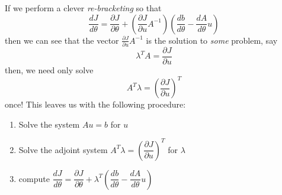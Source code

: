 If we perform a clever \textit{re-bracketing} so that
\begin{equation}
  \frac{dJ}{d\theta} = \frac{\partial J}{\partial \theta} + \left(\frac{\partial J}{\partial u}A^{-1}\right)\left(\frac{db}{d\theta} - \frac{dA}{d\theta}u \right)
\end{equation}
then we can see that the vector $\frac{\partial J}{\partial u}A^{-1}$ is the solution to \textit{some} problem, say
\begin{equation}
  \lambda^TA = \frac{\partial J}{\partial u}
\end{equation}
then, we need only solve
\begin{equation}
  A^T\lambda = \left(\frac{\partial J}{\partial u}\right)^T
\end{equation}
once! This leaves us with the following procedure:
\begin{enumerate}
\item Solve the system $Au = b$ for $u$
\item Solve the adjoint system $A^T\lambda = \left(\dfrac{\partial J}{\partial u}\right)^T$ for $\lambda$
\item compute $\dfrac{dJ}{d\theta} = \dfrac{\partial J}{\partial\theta} + \lambda^T\left(\dfrac{db}{d\theta} -  \dfrac{dA}{d\theta} u \right)$
\end{enumerate}


